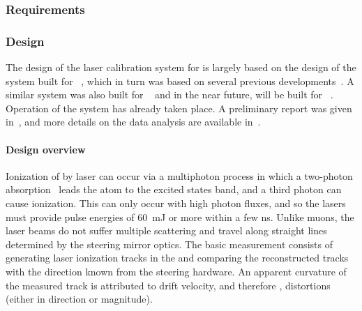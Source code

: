 




\subsubsection{Requirements}
\label{sec:sp-calib-laser-req}








\subsubsection{Design}
\label{sec:sp-calib-sys-las-ion-des}

The design of the laser calibration system for  is largely based on the design of the system built for ~\cite{microboone}, which in turn was based on several previous developments~\cite{Rossi:2009im,Zeller:2013sva,Ereditato:2014lra,Ereditato:82014tya}. A similar system was also built for ~\cite{Berns:2013usa} and in the near future, will be built for ~\cite{Antonello:2015lea}. Operation of the  system has already taken place. A preliminary report was given in~\cite{bib:chen2018}, and more details on the data analysis are available in~\cite{bib:uBlaser2019}.

\paragraph{Design overview}
Ionization of  by laser can occur via a multiphoton process in which a two-photon absorption~\cite{Badhrees:2010zz} leads the atom to the excited states band, and a third photon can cause ionization. This can only occur with high photon fluxes, and so the lasers must provide pulse energies of \SI{60}{\milli\joule} or more within a few ns. Unlike muons, the laser beams do not suffer multiple scattering and travel along straight lines determined by the steering mirror optics. The basic measurement consists of %
generating laser ionization tracks in the  and comparing the reconstructed tracks with the direction known from the steering hardware. 
An apparent curvature of the measured track is attributed to drift velocity, and therefore \efield, distortions (either in direction or magnitude).


